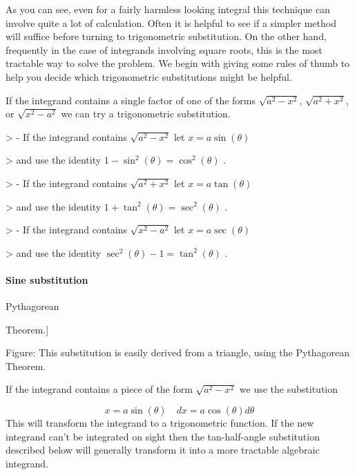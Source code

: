 As you can see, even for a fairly harmless looking integral this technique can involve quite a lot of calculation. Often it is helpful to see if a simpler method will suffice before turning to trigonometric substitution. On the other hand, frequently in the case of integrands involving square roots, this is the most tractable way to solve the problem. We begin with giving some rules of thumb to help you decide which trigonometric substitutions might be helpful.



If the integrand contains a single factor of one of the forms $\sqrt{a^2-x^2}$, $\sqrt{a^2+x^2}$, or $\sqrt{x^2-a^2}$ we can try a trigonometric substitution.



> -   If the integrand contains $\sqrt{a^2-x^2}$ let $x=a\sin(\theta)$

>     and use the identity $1-\sin^2(\theta)=\cos^2(\theta)$ .

> -   If the integrand contains $\sqrt{a^2+x^2}$ let $x=a\tan(\theta)$

>     and use the identity $1+\tan^2(\theta)=\sec^2(\theta)$ .

> -   If the integrand contains $\sqrt{x^2-a^2}$ let $x=a\sec(\theta)$

>     and use the identity $\sec^2(\theta)-1=\tan^2(\theta)$ .



\paragraph{Sine substitution}




Pythagorean

Theorem.]



Figure: This substitution is easily derived from a triangle, using the Pythagorean Theorem.



If the integrand contains a piece of the form $\sqrt{a^2-x^2}$ we use the substitution



$$x=a\sin(\theta)\quad dx=a\cos(\theta)d\theta$$ This will transform the integrand to a trigonometric function. If the new integrand can't be integrated on sight then the tan-half-angle substitution described below will generally transform it into a more tractable algebraic integrand.



